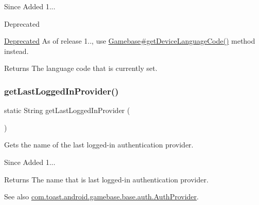 \begin{DoxySince}{Since}
Added 1... 
\end{DoxySince}
\begin{DoxyRefDesc}{Deprecated}
\item[\hyperlink{deprecated__deprecated000002}{Deprecated}]As of release 1.., use \hyperlink{classcom_1_1toast_1_1android_1_1gamebase_1_1_gamebase_a9816db7baf613297601e327207cda02d}{Gamebase\#get\+Device\+Language\+Code()} method instead. \end{DoxyRefDesc}
\begin{DoxyReturn}{Returns}
The language code that is currently set. 
\end{DoxyReturn}
\mbox{\label{classcom_1_1toast_1_1android_1_1gamebase_1_1_gamebase_aab024fc853da20582cd6cd85ecd9f6a6}} 
\subsubsection{\texorpdfstring{get\+Last\+Logged\+In\+Provider()}{getLastLoggedInProvider()}}
{\footnotesize\ttfamily static String get\+Last\+Logged\+In\+Provider (\begin{DoxyParamCaption}{ }\end{DoxyParamCaption})\hspace{0.3cm}{\ttfamily [static]}}



Gets the name of the last logged-\/in authentication provider. 

\begin{DoxySince}{Since}
Added 1... 
\end{DoxySince}
\begin{DoxyReturn}{Returns}
The name that is last logged-\/in authentication provider. 
\end{DoxyReturn}
\begin{DoxySeeAlso}{See also}
\hyperlink{interfacecom_1_1toast_1_1android_1_1gamebase_1_1base_1_1auth_1_1_auth_provider}{com.\+toast.\+android.\+gamebase.\+base.\+auth.\+Auth\+Provider}. 
\end{DoxySeeAlso}
\mbox{\label{classcom_1_1toast_1_1android_1_1gamebase_1_1_gamebase_aeb5168abbd62c631b65247e6289d1e2d}} 
